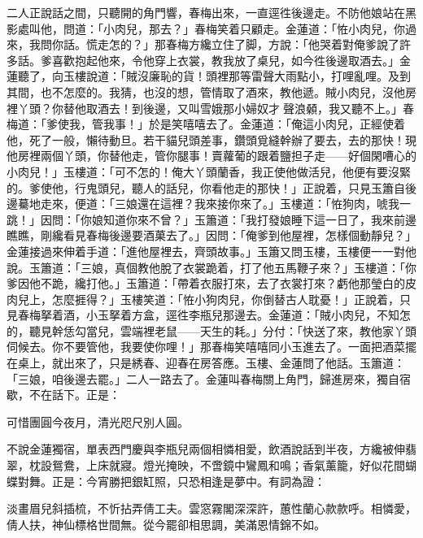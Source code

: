 二人正說話之間，只聽開的角門響，春梅出來，一直逕徃後邊走。不防他娘站在黑影處叫他，問道：「小肉兒，那去？」春梅笑着只顧走。{}金蓮道：「恠小肉兒，你過來，我問你話。慌走怎的？」那春梅方纔立住了脚，方說：「他哭着對俺爹說了許多話。爹喜歡抱起他來，令他穿上衣裳，教我放了桌兒，如今徃後邊取酒去。」金蓮聽了，向玉樓說道：「賊沒廉恥的貨！頭裡那等雷聲大雨點小，打哩亂哩。及到其間，也不怎麼的。我猜，也沒的想，管情取了酒來，教他遞。{}賊小肉兒，沒他房裡丫頭？你替他取酒去！到後邊，又叫雪娥那小婦奴才𣭈聲浪顙，{}我又聽不上。」春梅道：「爹使我，管我事！」於是笑嘻嘻去了。金蓮道：「俺這小肉兒，正經使着他，死了一般，懶待動旦。{}若干貓兒頭差事，鑽頭覓縫幹辦了要去，去的那快！現他房裡兩個丫頭，你替他走，管你腿事！賣蘿葡的跟着鹽担子走——好個閑嘈心的小肉兒！」玉樓道：「可不怎的！俺大丫頭蘭香，我正使他做活兒，他便有要沒緊的。爹使他，行鬼頭兒，聽人的話兒，你看他走的那快！」正說着，只見玉簫自後邊驀地走來，便道：「三娘還在這裡？我來接你來了。」玉樓道：「恠狗肉，唬我一跳！」{}因問：「你娘知道你來不曾？」玉簫道：「我打發娘睡下這一日了，我來前邊瞧瞧，剛纔看見春梅後邊要酒菓去了。」因問：「俺爹到他屋裡，怎樣個動靜兒？」金蓮接過來伸着手道：「進他屋裡去，齊頭故事。」{}玉簫又問玉樓，玉樓便一一對他說。玉簫道：「三娘，真個教他脫了衣裳跪着，打了他五馬鞭子來？」玉樓道：「你爹因他不跪，纔打他。」玉簫道：「帶着衣服打來，去了衣裳打來？虧他那瑩白的皮肉兒上，怎麼捱得？」{}玉樓笑道：「恠小狗肉兒，你倒替古人耽憂！」正說着，只見春梅拏着酒，小玉拏着方盒，逕徃李瓶兒那邊去。金蓮道：「賊小肉兒，不知怎的，聽見幹恁勾當兒，雲端裡老鼠——天生的耗。」分付：「快送了來，教他家丫頭伺候去。你不要管他，我要使你哩！」那春梅笑嘻嘻同小玉進去了。一面把酒菜擺在桌上，就出來了，只是綉春、迎春在房答應。玉樓、金蓮問了他話。玉簫道：「三娘，咱後邊去罷。」二人一路去了。金蓮叫春梅關上角門，歸進房來，獨自宿歇，不在話下。正是：

\begin{myquote} 
可惜團圓今夜月，清光咫尺別人圓。
\end{myquote} 

不說金蓮獨宿，單表西門慶與李瓶兒兩個相憐相愛，飲酒說話到半夜，方纔被伸翡翠，枕設鴛鴦，上床就寢。燈光掩映，不啻鏡中鸞鳳和鳴；香氣薰籠，好似花間蝴蝶對舞。正是：今宵勝把銀缸照，只恐相逢是夢中。有詞為證：

\begin{myquote} 
淡畫眉兒斜插梳，不忻拈弄倩工夫。雲窓霧閣深深許，蕙性蘭心款款呼。相憐愛，倩人扶，神仙標格世間無。從今罷卻相思調，美滿恩情錦不如。
\end{myquote} 

